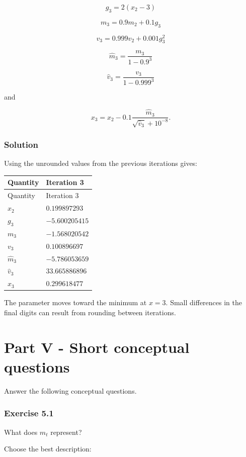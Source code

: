 \documentclass[10pt]{article}
\begin{document}
\[
g_3 = 2(x_2-3)
\]

\[
m_3 = 0.9m_2+0.1g_3
\]

\[
v_3 = 0.999v_2+0.001g_3^2
\]

\[
\hat m_3=\frac{m_3}{1-0.9^3}
\]

\[
\hat v_3=\frac{v_3}{1-0.999^3}
\]

and

\[
x_3 =
x_2 -
0.1
\frac{\hat m_3}
{\sqrt{\hat v_3}+10^{-8}}.
\]

\begingroup\color{red}

\subsubsection*{Solution}
Using the unrounded values from the previous iterations gives:

\begingroup
\small
\setlength{\tabcolsep}{4pt}
\begin{longtable}{l|l}
Quantity & Iteration 3 \\[1.5pt]
\hline
\endfirsthead
Quantity & Iteration 3 \\[1.5pt]
\hline
\endhead
$x_2$ & $0.199897293$ \\[1.5pt]
$g_3$ & $-5.600205415$ \\[1.5pt]
$m_3$ & $-1.568020542$ \\[1.5pt]
$v_3$ & $0.100896697$ \\[1.5pt]
$\hat m_3$ & $-5.786053659$ \\[1.5pt]
$\hat v_3$ & $33.665886896$ \\[1.5pt]
$x_3$ & $0.299618477$ \\[1.5pt]
\end{longtable}
\endgroup
The parameter moves toward the minimum at $x=3$. Small differences in the final digits can result from rounding between iterations.

\par\endgroup

\clearpage
\section*{Part V - Short conceptual questions}
Answer the following conceptual questions.

\subsubsection*{Exercise 5.1}
What does $m_t$ represent?

Choose the best description:
\end{document}
